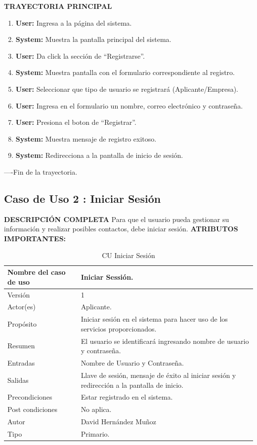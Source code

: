 \textbf{TRAYECTORIA PRINCIPAL}
\begin{enumerate}
\item	\textbf{User:  }Ingresa a la página del sistema.
\item	\textbf{System: }Muestra la pantalla principal del sistema.
\item	\textbf{User:  }Da click la sección de “Registrarse”.
\item	\textbf{System: }Muestra pantalla con el formulario correspondiente al registro.
\item	\textbf{User:  }Seleccionar que tipo de usuario se registrará (Aplicante/Empresa).
\item	\textbf{User:  }Ingresa en el formulario un nombre, correo electrónico y contraseña.
\item	\textbf{User:  }Presiona el boton de “Registrar”.
\item	\textbf{System: }Muestra mensaje de registro exitoso.
\item	\textbf{System: }Redirecciona a la pantalla de inicio de sesión.
\end{enumerate}
----Fin de la trayectoria.



\newpage
\subsection{Caso de Uso 	2	: Iniciar Sesión	}
		\textbf{DESCRIPCIÓN COMPLETA}	
		\newline 	
		Para que el usuario pueda gestionar su información y realizar posibles contactos, debe iniciar sesión. 	\newline \newline
		\textbf{ATRIBUTOS IMPORTANTES:}	
\begin{table}[h]			
        \begin{center}			
\begin{tabular}{|l|p{11cm}|} \hline			
Nombre del caso de uso	&	Iniciar Sessión.	\\ \hline
Versión	&	1	\\ \hline
Actor(es)	&	Aplicante.	\\ \hline
Propósito	&	Iniciar sesión en el sistema para hacer uso de los servicios proporcionados.	\\ \hline
Resumen	&	El usuario se identificará ingresando nombre de usuario y contraseña.	\\ \hline
Entradas	&	Nombre de Usuario y Contraseña.	\\ \hline
				
			
Salidas	&	Llave de sesión, mensaje de éxito al iniciar sesión y redirección a la pantalla de inicio.	\\ \hline
Precondiciones	&	Estar registrado en el sistema.	\\ \hline
Post condiciones	&	No aplica.	\\ \hline
Autor	&	David Hernández Muñoz	\\ \hline
Tipo	&	Primario.	\\ \hline
\end{tabular}			
        \caption	{	CU Iniciar Sesión	}
        \label	{tabla	2	}
        \end{center}			
\end{table}			

